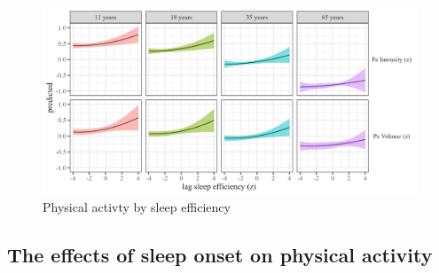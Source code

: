 \documentclass[
  man]{apa6}
\begin{document}
\begin{figure}
\includegraphics[width=7.08in]{../Figures/Pa on sleep_efficiency_lag} \caption{Physical activty by sleep efficiency}\label{fig:PA-by-sleep-efficiency-fig}
\end{figure}

\hypertarget{the-effects-of-sleep-onset-on-physical-activity}{%
\subsection{The effects of sleep onset on physical activity}\label{the-effects-of-sleep-onset-on-physical-activity}}
\end{document}
